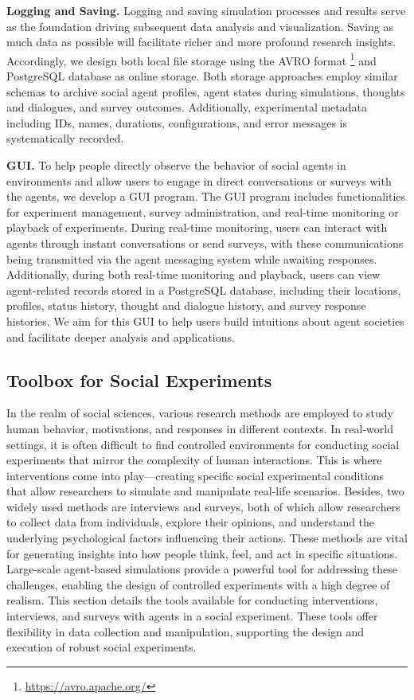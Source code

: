 \textbf{Logging and Saving.}
Logging and saving simulation processes and results serve as the foundation driving subsequent data analysis and visualization.
Saving as much data as possible will facilitate richer and more profound research insights.
Accordingly, we design both local file storage using the AVRO format \footnote{\url{https://avro.apache.org/}} and PostgreSQL database as online storage.
Both storage approaches employ similar schemas to archive social agent profiles, agent states during simulations, thoughts and dialogues, and survey outcomes.
Additionally, experimental metadata including IDs, names, durations, configurations, and error messages is systematically recorded.

\textbf{GUI.}
To help people directly observe the behavior of social agents in environments and allow users to engage in direct conversations or surveys with the agents, we develop a GUI program.
The GUI program includes functionalities for experiment management, survey administration, and real-time monitoring or playback of experiments.
During real-time monitoring, users can interact with agents through instant conversations or send surveys, with these communications being transmitted via the agent messaging system while awaiting responses.
Additionally, during both real-time monitoring and playback, users can view agent-related records stored in a PostgreSQL database, including their locations, profiles, status history, thought and dialogue history, and survey response histories.
We aim for this GUI to help users build intuitions about agent societies and facilitate deeper analysis and applications.


\subsection{Toolbox for Social Experiments}\label{sec:sim:exp}

In the realm of social sciences, various research methods are employed to study human behavior, motivations, and responses in different contexts. In real-world settings, it is often difficult to find controlled environments for conducting social experiments that mirror the complexity of human interactions. This is where interventions come into play—creating specific social experimental conditions that allow researchers to simulate and manipulate real-life scenarios. Besides, two widely used methods are interviews and surveys, both of which allow researchers to collect data from individuals, explore their opinions, and understand the underlying psychological factors influencing their actions. These methods are vital for generating insights into how people think, feel, and act in specific situations.  Large-scale agent-based simulations provide a powerful tool for addressing these challenges, enabling the design of controlled experiments with a high degree of realism.
This section details the tools available for conducting interventions, interviews, and surveys with agents in a social experiment. These tools offer flexibility in data collection and manipulation, supporting the design and execution of robust social experiments.

